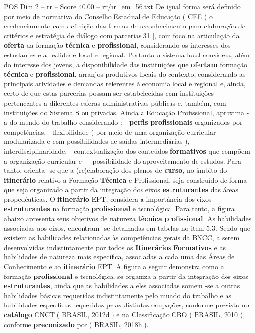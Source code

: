 \begin{textsample}{POS Dim 2 – rr – Score 40.00 – rr/rr\_em\_56.txt}
De igual forma será definido por meio de normativa do Conselho Estadual de Educação ( CEE ) o credenciamento com definição das formas de reconhecimento para elaboração de critérios e estratégia de diálogo com parcerias[31 ], com foco na articulação da \textbf{oferta} da formação \textbf{técnica} e \textbf{profissional}, considerando os interesses dos estudantes e a realidade local e regional.
Portanto o sistema local considera, além do interesse dos jovens, a disponibilidade das instituições que \textbf{ofertam} formação \textbf{técnica} e \textbf{profissional}, arranjos produtivos locais do contexto, considerando as principais atividades e demandas referentes à economia local e regional e, ainda, certo de que estas parcerias possam ser estabelecidas com instituições pertencentes a diferentes esferas administrativas públicas e, também, com instituições do Sistema S ou privadas.
Ainda a Educação Profissional, aproxima -a do mundo do trabalho considerando : - \textbf{perfis} \textbf{profissionais} organizados por competências, - flexibilidade ( por meio de uma organização curricular modularizada e com possibilidades de saídas intermediárias ), - interdisciplinaridade, - contextualização dos conteúdos \textbf{formativos} que compõem a organização curricular e ; - possibilidade do aproveitamento de estudos.
Para tanto, orienta -se que a (re)elaboração dos planos de \textbf{curso}, no âmbito do \textbf{itinerário} relativo a Formação \textbf{Técnica} e Profissional, seja construído de forma que seja organizado a partir da integração dos eixos \textbf{estruturantes} das áreas propedêuticas.
O \textbf{itinerário} EPT, considera a importância dos eixos \textbf{estruturantes} na formação \textbf{profissional} e tecnológica.
Para tanto, a figura abaixo apresenta seus objetivos de natureza \textbf{técnica} \textbf{profissional}.
As habilidades associadas aos eixos, encontram -se detalhadas em tabelas no item 5.3.
Sendo que existem as habilidades relacionadas às competências gerais da BNCC, a serem desenvolvidas indistintamente por todos os \textbf{Itinerários} \textbf{Formativos} e as habilidades de natureza mais específica, associadas a cada uma das Áreas de Conhecimento e ao \textbf{itinerário} EPT.
A figura a seguir demonstra como a formação \textbf{profissional} e tecnológica, se organiza a partir da integração dos eixos \textbf{estruturantes}, ainda que as habilidades a eles associadas somem -se a outras habilidades básicas requeridas indistintamente pelo mundo do trabalho e as habilidades específicas requeridas pelas distintas ocupações, conforme previsto no \textbf{catálogo} CNCT ( BRASIL, 2012d ) e na Classificação CBO ( BRASIL, 2010 ), conforme \textbf{preconizado} por ( BRASIL, 2018h ).

\end{textsample}
